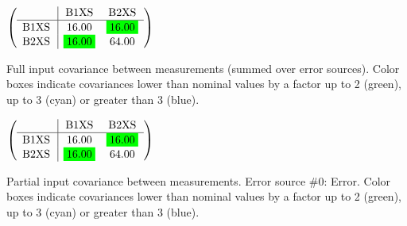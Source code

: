 \begin{table}[H]
\scriptsize
\begin{center}
\renewcommand{\arraystretch}{1.1}
\begin{math}\left(\begin{array}{c|cc}
 & \mathrm{B1XS} & 
\mathrm{B2XS} \\
\hline
\mathrm{B1XS} \hspace*{2pt} &      16.00 &  \colorbox{Green1}{$     16.00$} \\
\mathrm{B2XS} \hspace*{2pt} &  \colorbox{Green1}{$     16.00$} &      64.00 \\
\end{array}\right)\end{math}
\caption{Full input covariance between measurements (summed over error sources). Color boxes indicate covariances lower than nominal values by a factor up to 2 (green), up to 3 (cyan) or greater than 3 (blue).}
\renewcommand{\arraystretch}{1}
\end{center}
\end{table}
\begin{table}[H]
\scriptsize
\begin{center}
\renewcommand{\arraystretch}{1.1}
\begin{math}\left(\begin{array}{c|cc}
 & \mathrm{B1XS} & 
\mathrm{B2XS} \\
\hline
\mathrm{B1XS} \hspace*{2pt} &      16.00 &  \colorbox{Green1}{$     16.00$} \\
\mathrm{B2XS} \hspace*{2pt} &  \colorbox{Green1}{$     16.00$} &      64.00 \\
\end{array}\right)\end{math}
\caption{Partial input covariance between measurements. Error source \#0: Error. Color boxes indicate covariances lower than nominal values by a factor up to 2 (green), up to 3 (cyan) or greater than 3 (blue).}
\renewcommand{\arraystretch}{1}
\end{center}
\end{table}
\clearpage
